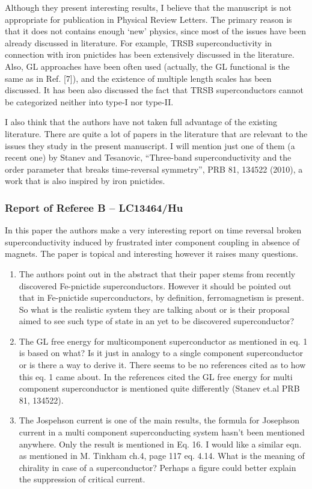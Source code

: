 \documentclass[11pt]{article}
\begin{document}
Although they present interesting results, I believe that the manuscript
is not appropriate for publication in Physical Review Letters. The
primary reason is that it does not contains enough `new' physics, since
most of the issues have been already discussed in literature. For
example, TRSB superconductivity in connection with iron pnictides has
been extensively discussed in the literature. Also, GL approaches have
been often used (actually, the GL functional is the same as in Ref.
{[}7{]}), and the existence of multiple length scales has been
discussed. It has been also discussed the fact that TRSB superconductors
cannot be categorized neither into type-I nor type-II.

I also think that the authors have not taken full advantage of the
existing literature. There are quite a lot of papers in the literature
that are relevant to the issues they study in the present manuscript. I
will mention just one of them (a recent one) by Stanev and Tesanovic,
``Three-band superconductivity and the order parameter that breaks
time-reversal symmetry'', PRB 81, 134522 (2010), a work that is also
inspired by iron pnictides.

\hypertarget{report-of-referee-b-lc13464hu}{%
\subsubsection{Report of Referee B --
LC13464/Hu}\label{report-of-referee-b-lc13464hu}}

In this paper the authors make a very interesting report on time
reversal broken superconductivity induced by frustrated inter component
coupling in absence of magnets. The paper is topical and interesting
however it raises many questions.

\begin{enumerate}
\def\labelenumi{\arabic{enumi}.}
\item
  The authors point out in the abstract that their paper stems from
  recently discovered Fe-pnictide superconductors. However it should be
  pointed out that in Fe-pnictide superconductors, by definition,
  ferromagnetism is present. So what is the realistic system they are
  talking about or is their proposal aimed to see such type of state in
  an yet to be discovered superconductor?
\item
  The GL free energy for multicomponent superconductor as mentioned in
  eq. 1 is based on what? Is it just in analogy to a single component
  superconductor or is there a way to derive it. There seems to be no
  references cited as to how this eq. 1 came about. In the references
  cited the GL free energy for multi component superconductor is
  mentioned quite differently (Stanev et.al PRB 81, 134522).
\item
  The Jospehson current is one of the main results, the formula for
  Josephson current in a multi component superconducting system hasn't
  been mentioned anywhere. Only the result is mentioned in Eq. 16. I
  would like a similar eqn. as mentioned in M. Tinkham ch.4, page 117
  eq. 4.14. What is the meaning of chirality in case of a
  superconductor? Perhaps a figure could better explain the suppression
  of critical current.
\end{enumerate}
\end{document}

